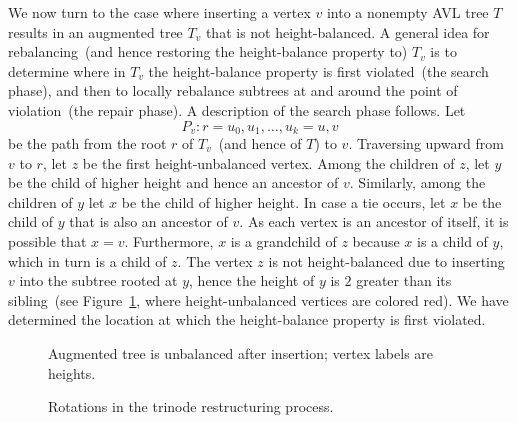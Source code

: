 We now turn to the case where inserting a vertex $v$ into a nonempty
AVL tree $T$ results in an augmented tree $T_v$ that is not
height-balanced. A general idea for rebalancing~(and hence restoring
the height-balance property to) $T_v$ is to determine where in $T_v$
the height-balance property is first violated~(the search phase), and
then to locally rebalance subtrees at and around the point of
violation~(the repair phase). A description of the search phase
follows. Let
\[
P_v: r = u_0, u_1, \dots, u_k = u, v
\]
be the path from the root $r$ of $T_v$~(and hence of $T$) to
$v$. Traversing upward from $v$ to $r$, let $z$ be the first
height-unbalanced vertex. Among the children of $z$, let $y$ be the
child of higher height and hence an ancestor of $v$. Similarly, among
the children of $y$ let $x$ be the child of higher height. In case a
tie occurs, let $x$ be the child of $y$ that is also an ancestor of
$v$. As each vertex is an ancestor of itself, it is possible that
$x = v$. Furthermore, $x$ is a grandchild of $z$ because $x$ is a
child of $y$, which in turn is a child of $z$. The vertex $z$ is not
height-balanced due to inserting $v$ into the subtree rooted at $y$,
hence the height of $y$ is $2$ greater than its sibling~(see
Figure~\ref{fig:tree_data_structures:augmented_tree_unbalanced}, where
height-unbalanced vertices are colored red). We
have determined the location at which the height-balance property is
first violated.

\begin{figure}[!htbp]
\centering

\caption{Augmented tree is unbalanced after insertion; vertex labels
  are heights.}
\label{fig:tree_data_structures:augmented_tree_unbalanced}
\end{figure}

\begin{figure}[!htbp]
\centering

\caption{Rotations in the trinode restructuring process.}
\label{fig:tree_data_structures:AVL_trinode_restructure}
\end{figure}

